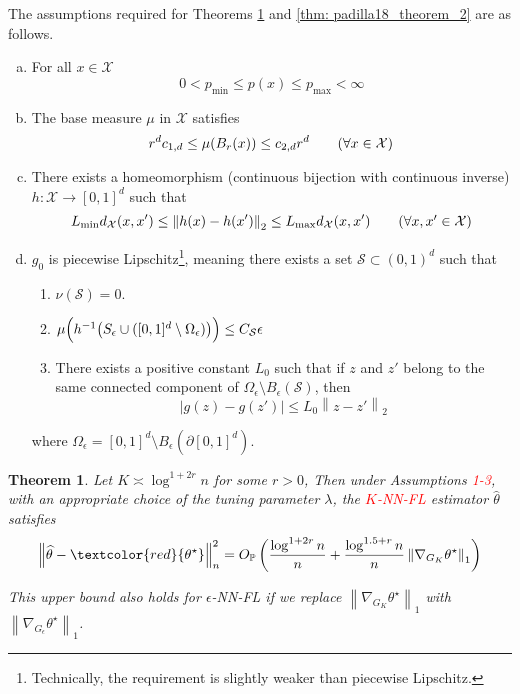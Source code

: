 \documentclass{article}
\newcommand{\norm}[1]{\left\lVert#1\right\rVert}
\newcommand{\abs}[1]{\left \lvert #1 \right \rvert}
\newcommand{\1}{\mathbb{I}}
\newcommand{\Xset}{\mathcal{X}}
\newcommand{\Sset}{\mathcal{S}}
\newcommand{\Pbb}{\mathbb{P}}
\theoremstyle{alden}
\theoremstyle{aldenthm}
\newtheorem{theorem}{Theorem}
\theoremstyle{definition}
\theoremstyle{remark}
\begin{document}
The assumptions required for Theorems \ref{thm: padilla18_theorem_1} and \ref{thm: padilla18_theorem_2} are as follows.
\begin{enumerate}[(a)]
	\item For all $x \in \Xset$
	\begin{equation*}
	0 < p_{\min} \leq p(x) \leq p_{\max} < \infty
	\end{equation*}
	\item The base measure $\mu$ in $\Xset$ satisfies
	\begin{equation*}
	r^d c_{1,d} \leq \mu(B_r(x)) \leq c_{2,d} r^d \tag{$\forall x \in \Xset$}
	\end{equation*}
	\item There exists a homeomorphism (continuous bijection with continuous inverse) $h: \Xset \to [0,1]^d$ such that
	\begin{equation*}
	L_{\min} d_{\Xset}(x,x') \leq \norm{h(x) - h(x')}_2  \leq L_{\max} d_{\Xset}(x,x') \tag{$\forall x,x' \in \Xset$}
	\end{equation*}
	\item $g_0$ is piecewise Lipschitz\footnote{Technically, the requirement is slightly weaker than piecewise Lipschitz.}, meaning there exists a set $\Sset \subset (0,1)^d$ such that
	\begin{enumerate}
		\item $\nu(\Sset) = 0$.
		\item $\mu\Bigl( h^{-1}\bigl(S_{\epsilon} \cup ([0,1]^d \setminus \Omega_{\epsilon})\bigr) \Bigr) \leq C_{\Sset} \epsilon$
		\item There exists a positive constant $L_0$ such that if $z$ and $z'$ belong to the same connected component of $\Omega_{\epsilon} \setminus B_{\epsilon}(\Sset)$, then 
		\begin{equation*}
		\abs{g(z) - g(z')} \leq L_0 \norm{z - z'}_2
		\end{equation*}
	\end{enumerate}
	where $\Omega_{\epsilon} = [0,1]^d \setminus B_{\epsilon}(\partial [0,1]^d)$.
\end{enumerate}

\begin{theorem}
	\label{thm: padilla18_theorem_1}
	Let $K \asymp \log^{1 + 2r} n$ for some $r > 0$, Then under Assumptions \textcolor{red}{1-3}, with an appropriate choice of the tuning parameter $\lambda$, the \textcolor{red}{$K$-NN-FL} estimator $\widehat{\theta}$ satisfies
	\begin{equation*}
	\norm{\widehat{\theta} - \textcolor{red}{\theta^{\star}}}_n^2 = O_{\Pbb}\left(\frac{\log^{1 + 2r} n}{n} + \frac{\log^{1.5 + r} n}{n}\norm{\nabla_{G_K} \theta^{\star}}_1 \right)
	\end{equation*}
	
	This upper bound also holds for $\epsilon$-NN-FL if we replace $\norm{\nabla_{G_K} \theta^{\star}}_1 $ with $\norm{\nabla_{G_{\epsilon}} \theta^{\star}}_1$.
\end{theorem}
\end{document}
